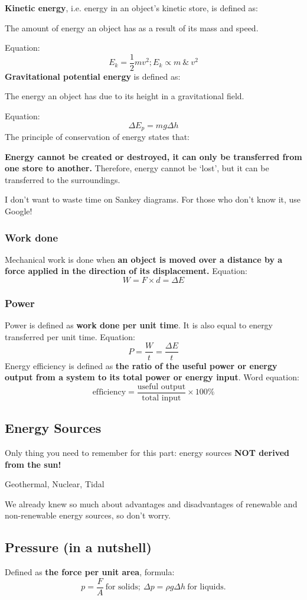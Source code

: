 \documentclass[a4paper,12pt]{article}
\begin{document}
\textbf{Kinetic energy}, i.e. energy in an object's kinetic store, is defined as:
\begin{center}
The amount of energy an object has as a result of its mass and speed.
\end{center}
Equation:
\[E_k=\frac{1}2mv^2; E_k \propto m \ \& \ v^2\]
\textbf{Gravitational potential energy} is defined as:
\begin{center}
The energy an object has due to its height in a gravitational field.
\end{center}
Equation:
\[\Delta E_p=mg\Delta h\]
The principle of conservation of energy states that:
\begin{center}
\textbf{Energy cannot be created or destroyed, it can only be transferred from one store to another.}
Therefore, energy cannot be ‘lost’, but it can be transferred to the surroundings.
\end{center}
I don't want to waste time on Sankey diagrams. For those who don't know it, use Google!
\subsubsection{Work done}
Mechanical work is done when \textbf{an object is moved over a distance by a force applied in the direction of its displacement.} Equation:
\[W=F\times d=\Delta E\]
\subsubsection{Power}
Power is defined as \textbf{work done per unit time}. It is also equal to energy transferred per unit time. Equation:
\[P=\frac{W}t=\frac{\Delta E}t\]
Energy efficiency is defined as \textbf{the ratio of the useful power or energy output from a system to its total power or energy input}. Word equation:
\[\text{efficiency}=\frac{\text{useful output}}{\text{total input}}\times 100\%\]
\subsection{Energy Sources}
Only thing you need to remember for this part: energy sources \textbf{NOT derived from the sun!}
\begin{center}
Geothermal, Nuclear, Tidal
\end{center}
We already knew so much about advantages and disadvantages of renewable and non-renewable energy sources, so don't worry. 
\subsection{Pressure (in a nutshell)}
Defined as \textbf{the force per unit area}, formula:
\[p=\frac{F}A\ \text{for solids};\ \Delta p=\rho g\Delta h\ \text{for liquids.} \]
\newpage
\end{document}

